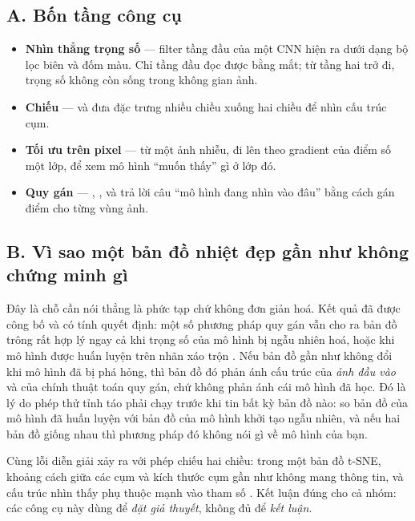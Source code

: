 \documentclass[../../deep_learning.tex]{subfiles}
\begin{document}
\subsection{A. Bốn tầng công cụ}
\begin{itemize}
\item \textbf{Nhìn thẳng trọng số} --- filter tầng đầu của một CNN hiện ra dưới dạng bộ lọc biên và đốm màu. Chỉ tầng đầu đọc được bằng mắt; từ tầng hai trở đi, trọng số không còn sống trong không gian ảnh.
\item \textbf{Chiếu } ---  \cite{maaten2008tsne} và  \cite{mcinnes2018umap} đưa đặc trưng nhiều chiều xuống hai chiều để nhìn cấu trúc cụm.
\item \textbf{Tối ưu trên pixel} --- từ một ảnh nhiễu, đi lên theo gradient của điểm số một lớp, để xem mô hình ``muốn thấy'' gì ở lớp đó.
\item \textbf{Quy gán} --- , , và  \cite{selvaraju2017gradcam} trả lời câu ``mô hình đang nhìn vào đâu'' bằng cách gán điểm cho từng vùng ảnh.
\end{itemize}

\subsection{B. Vì sao một bản đồ nhiệt đẹp gần như không chứng minh gì}
Đây là chỗ cần nói thẳng là phức tạp chứ không đơn giản hoá. Kết quả đã được công bố và có tính quyết định: một số phương pháp quy gán vẫn cho ra bản đồ trông rất hợp lý ngay cả khi trọng số của mô hình bị ngẫu nhiên hoá, hoặc khi mô hình được huấn luyện trên nhãn xáo trộn \cite{adebayo2018sanity}. Nếu bản đồ gần như không đổi khi mô hình đã bị phá hỏng, thì bản đồ đó phản ánh cấu trúc của \emph{ảnh đầu vào} và của chính thuật toán quy gán, chứ không phản ánh cái mô hình đã học. Đó là lý do phép thử tỉnh táo phải chạy trước khi tin bất kỳ bản đồ nào: so bản đồ của mô hình đã huấn luyện với bản đồ của mô hình khởi tạo ngẫu nhiên, và nếu hai bản đồ giống nhau thì phương pháp đó không nói gì về mô hình của bạn.

Cùng lỗi diễn giải xảy ra với phép chiếu hai chiều: trong một bản đồ t-SNE, khoảng cách giữa các cụm và kích thước cụm gần như không mang thông tin, và cấu trúc nhìn thấy phụ thuộc mạnh vào tham số . Kết luận đúng cho cả nhóm: các công cụ này dùng để \emph{đặt giả thuyết}, không đủ để \emph{kết luận}.
\end{document}
